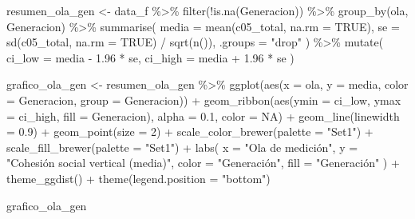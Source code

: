 \documentclass[
  spanish,
  a4paper,
  oneside]{scrbook}
\newenvironment{Shaded}{\begin{snugshade}}{\end{snugshade}}
\newcommand{\AttributeTok}[1]{\textcolor[rgb]{0.40,0.45,0.13}{#1}}
\newcommand{\ConstantTok}[1]{\textcolor[rgb]{0.56,0.35,0.01}{#1}}
\newcommand{\DecValTok}[1]{\textcolor[rgb]{0.68,0.00,0.00}{#1}}
\newcommand{\FloatTok}[1]{\textcolor[rgb]{0.68,0.00,0.00}{#1}}
\newcommand{\FunctionTok}[1]{\textcolor[rgb]{0.28,0.35,0.67}{#1}}
\newcommand{\NormalTok}[1]{\textcolor[rgb]{0.00,0.23,0.31}{#1}}
\newcommand{\OtherTok}[1]{\textcolor[rgb]{0.00,0.23,0.31}{#1}}
\newcommand{\SpecialCharTok}[1]{\textcolor[rgb]{0.37,0.37,0.37}{#1}}
\newcommand{\StringTok}[1]{\textcolor[rgb]{0.13,0.47,0.30}{#1}}
\begin{document}
\begin{Shaded}
\begin{Highlighting}[]
\NormalTok{resumen\_ola\_gen }\OtherTok{\textless{}{-}}\NormalTok{ data\_f }\SpecialCharTok{\%\textgreater{}\%}
  \FunctionTok{filter}\NormalTok{(}\SpecialCharTok{!}\FunctionTok{is.na}\NormalTok{(Generacion)) }\SpecialCharTok{\%\textgreater{}\%}
  \FunctionTok{group\_by}\NormalTok{(ola, Generacion) }\SpecialCharTok{\%\textgreater{}\%}
  \FunctionTok{summarise}\NormalTok{(}
    \AttributeTok{media   =} \FunctionTok{mean}\NormalTok{(c05\_total, }\AttributeTok{na.rm =} \ConstantTok{TRUE}\NormalTok{),}
    \AttributeTok{se      =} \FunctionTok{sd}\NormalTok{(c05\_total, }\AttributeTok{na.rm =} \ConstantTok{TRUE}\NormalTok{) }\SpecialCharTok{/} \FunctionTok{sqrt}\NormalTok{(}\FunctionTok{n}\NormalTok{()),}
    \AttributeTok{.groups =} \StringTok{"drop"}
\NormalTok{  ) }\SpecialCharTok{\%\textgreater{}\%}
  \FunctionTok{mutate}\NormalTok{(}
    \AttributeTok{ci\_low  =}\NormalTok{ media }\SpecialCharTok{{-}} \FloatTok{1.96} \SpecialCharTok{*}\NormalTok{ se,}
    \AttributeTok{ci\_high =}\NormalTok{ media }\SpecialCharTok{+} \FloatTok{1.96} \SpecialCharTok{*}\NormalTok{ se}
\NormalTok{  )}

\NormalTok{grafico\_ola\_gen }\OtherTok{\textless{}{-}}\NormalTok{ resumen\_ola\_gen }\SpecialCharTok{\%\textgreater{}\%}
  \FunctionTok{ggplot}\NormalTok{(}\FunctionTok{aes}\NormalTok{(}\AttributeTok{x =}\NormalTok{ ola, }\AttributeTok{y =}\NormalTok{ media, }\AttributeTok{color =}\NormalTok{ Generacion, }\AttributeTok{group =}\NormalTok{ Generacion)) }\SpecialCharTok{+}
  \FunctionTok{geom\_ribbon}\NormalTok{(}\FunctionTok{aes}\NormalTok{(}\AttributeTok{ymin =}\NormalTok{ ci\_low, }\AttributeTok{ymax =}\NormalTok{ ci\_high, }\AttributeTok{fill =}\NormalTok{ Generacion),}
              \AttributeTok{alpha =} \FloatTok{0.1}\NormalTok{, }\AttributeTok{color =} \ConstantTok{NA}\NormalTok{) }\SpecialCharTok{+}
  \FunctionTok{geom\_line}\NormalTok{(}\AttributeTok{linewidth =} \FloatTok{0.9}\NormalTok{) }\SpecialCharTok{+}
  \FunctionTok{geom\_point}\NormalTok{(}\AttributeTok{size =} \DecValTok{2}\NormalTok{) }\SpecialCharTok{+}
  \FunctionTok{scale\_color\_brewer}\NormalTok{(}\AttributeTok{palette =} \StringTok{"Set1"}\NormalTok{) }\SpecialCharTok{+}
  \FunctionTok{scale\_fill\_brewer}\NormalTok{(}\AttributeTok{palette =} \StringTok{"Set1"}\NormalTok{) }\SpecialCharTok{+}
  \FunctionTok{labs}\NormalTok{(}
    \AttributeTok{x =} \StringTok{"Ola de medición"}\NormalTok{,}
    \AttributeTok{y =} \StringTok{"Cohesión social vertical (media)"}\NormalTok{,}
    \AttributeTok{color =} \StringTok{"Generación"}\NormalTok{,}
    \AttributeTok{fill  =} \StringTok{"Generación"}
\NormalTok{  ) }\SpecialCharTok{+}
  \FunctionTok{theme\_ggdist}\NormalTok{() }\SpecialCharTok{+}
  \FunctionTok{theme}\NormalTok{(}\AttributeTok{legend.position =} \StringTok{"bottom"}\NormalTok{)}

\NormalTok{grafico\_ola\_gen}
\end{Highlighting}
\end{Shaded}
\end{document}
